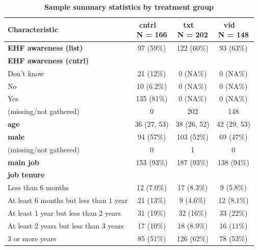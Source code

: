 \documentclass[
  11pt,
  oneside]{article}
\begin{document}
\begin{table}

\caption{\label{tab:tab-sum-w}\textbf{Sample summary statistics by treatment group}}
\centering
\begin{tabular}[t]{l|c|c|c}
\hline
\textbf{Characteristic} & \makecell[c]{\textbf{cntrl}\ \ \\N = 166} & \makecell[c]{\textbf{txt}\ \ \\N = 202} & \makecell[c]{\textbf{vid}\ \ \\N = 148}\\
\hline
\textbf{EHF awareness (list)} & 97 (59\%) & 122 (60\%) & 93 (63\%)\\
\hline
\textbf{EHF awareness (cntrl)} &  &  & \\
\hline
\hspace{1em}Don’t know & 21 (12\%) & 0 (NA\%) & 0 (NA\%)\\
\hline
\hspace{1em}No & 10 (6.2\%) & 0 (NA\%) & 0 (NA\%)\\
\hline
\hspace{1em}Yes & 135 (81\%) & 0 (NA\%) & 0 (NA\%)\\
\hline
\hspace{1em}(missing/not gathered) & 0 & 202 & 148\\
\hline
\textbf{age} & 36 (27, 53) & 38 (26, 52) & 42 (29, 53)\\
\hline
\textbf{male} & 94 (57\%) & 103 (52\%) & 69 (47\%)\\
\hline
\hspace{1em}(missing/not gathered) & 0 & 1 & 0\\
\hline
\textbf{main job} & 153 (93\%) & 187 (93\%) & 138 (94\%)\\
\hline
\textbf{job tenure} &  &  & \\
\hline
\hspace{1em}Less than 6 months & 12 (7.0\%) & 17 (8.3\%) & 9 (5.8\%)\\
\hline
\hspace{1em}At least 6 months but less than 1 year & 21 (13\%) & 9 (4.6\%) & 12 (8.1\%)\\
\hline
\hspace{1em}At least 1 year but less than 2 years & 31 (19\%) & 32 (16\%) & 33 (22\%)\\
\hline
\hspace{1em}At least 2 years but less than 3 years & 17 (10\%) & 18 (8.9\%) & 16 (11\%)\\
\hline
\hspace{1em}3 or more years & 85 (51\%) & 126 (62\%) & 78 (53\%)\\

\end{tabular}
\end{table}
\end{document}
